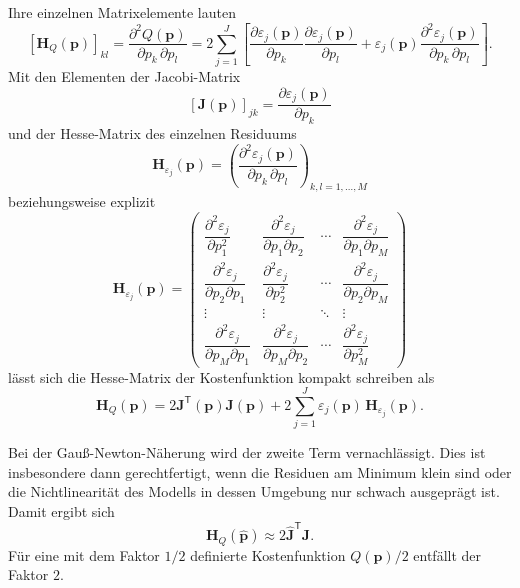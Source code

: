 Ihre einzelnen Matrixelemente lauten
\begin{equation*}
\left[\boldsymbol H_Q(\mathbf p)\right]_{kl}
=
\frac{\partial^2 Q(\mathbf p)}
     {\partial p_k\,\partial p_l}
=
2\sum_{j=1}^{J}
\left[
\frac{\partial \varepsilon_j(\mathbf p)}{\partial p_k}
\frac{\partial \varepsilon_j(\mathbf p)}{\partial p_l}
+
\varepsilon_j(\mathbf p)
\frac{\partial^2 \varepsilon_j(\mathbf p)}
     {\partial p_k\,\partial p_l}
\right].
\end{equation*}
Mit den Elementen der Jacobi-Matrix
\begin{equation*}
\left[\boldsymbol J(\mathbf p)\right]_{jk}
=
\frac{\partial \varepsilon_j(\mathbf p)}{\partial p_k}
\end{equation*}
und der Hesse-Matrix des einzelnen Residuums
\begin{equation*}
\boldsymbol H_{\varepsilon_j}(\mathbf p)
=
\left(
\frac{\partial^2 \varepsilon_j(\mathbf p)}
     {\partial p_k\,\partial p_l}
\right)_{k,l=1,\ldots,M}
\end{equation*}
beziehungsweise explizit
\begin{equation*}
\boldsymbol H_{\varepsilon_j}(\mathbf p)
=
\begin{pmatrix}
\dfrac{\partial^2\varepsilon_j}{\partial p_1^2}
&
\dfrac{\partial^2\varepsilon_j}{\partial p_1\partial p_2}
&
\cdots
&
\dfrac{\partial^2\varepsilon_j}{\partial p_1\partial p_M}
\\[1.2ex]
\dfrac{\partial^2\varepsilon_j}{\partial p_2\partial p_1}
&
\dfrac{\partial^2\varepsilon_j}{\partial p_2^2}
&
\cdots
&
\dfrac{\partial^2\varepsilon_j}{\partial p_2\partial p_M}
\\
\vdots & \vdots & \ddots & \vdots
\\[0.8ex]
\dfrac{\partial^2\varepsilon_j}{\partial p_M\partial p_1}
&
\dfrac{\partial^2\varepsilon_j}{\partial p_M\partial p_2}
&
\cdots
&
\dfrac{\partial^2\varepsilon_j}{\partial p_M^2}
\end{pmatrix}
\end{equation*}
lässt sich die Hesse-Matrix der Kostenfunktion kompakt schreiben als
\begin{equation}
\boldsymbol H_Q(\mathbf p)
=
2\boldsymbol J^{\mathsf T}(\mathbf p)\boldsymbol J(\mathbf p)
+
2\sum_{j=1}^{J}
\varepsilon_j(\mathbf p)\,
\boldsymbol H_{\varepsilon_j}(\mathbf p).
\label{eq:HessematrixKompakt}
\end{equation}

Bei der Gauß-Newton-Näherung wird der zweite Term vernachlässigt. Dies ist
insbesondere dann gerechtfertigt, wenn die Residuen am Minimum klein sind oder
die Nichtlinearität des Modells in dessen Umgebung nur schwach ausgeprägt ist.
Damit ergibt sich
\begin{equation}
\boldsymbol H_Q(\hat{\mathbf p})
\approx
2\hat{\boldsymbol J}^{\mathsf T}\hat{\boldsymbol J}.
\label{eq:HessematrixApprox}
\end{equation}
Für eine mit dem Faktor $1/2$ definierte Kostenfunktion
$Q(\mathbf p)/2$ entfällt der Faktor $2$.


